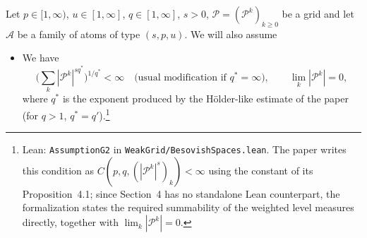 \documentclass[11pt]{amsart}
\theoremstyle{definition}
\newcommand{\lean}[1]{\texttt{#1}}
\begin{document}
Let $p \in [1,\infty)$, $u \in [1,\infty]$, $q \in [1,\infty]$, $s>0$,
$\mathcal{P}=(\mathcal{P}^k)_{k\geq 0}$ be a grid and let $\mathcal{A}$ be a
family of atoms of type $(s,p,u)$. We will also assume
\begin{itemize}
\item[$G_2$.] We have
$$\Big( \sum_k |\mathcal{P}^k|^{s q^\ast}\Big)^{1/q^\ast} < \infty
\quad\text{(usual modification if } q^\ast=\infty\text{)},
\qquad \lim_k |\mathcal{P}^k|=0,$$
where $q^\ast$ is the exponent produced by the H\"older-like estimate of the
paper (for $q>1$, $q^\ast = q'$).\footnote{Lean: \lean{AssumptionG2} in
\lean{WeakGrid/BesovishSpaces.lean}. The paper writes this condition as
$C(p,q,(|\mathcal{P}^k|^s)_k)<\infty$ using the constant of its
Proposition~4.1; since Section~4 has no standalone Lean counterpart, the
formalization states the required summability of the weighted level measures
directly, together with $\lim_k|\mathcal{P}^k| = 0$.}
\end{itemize}
\end{document}
